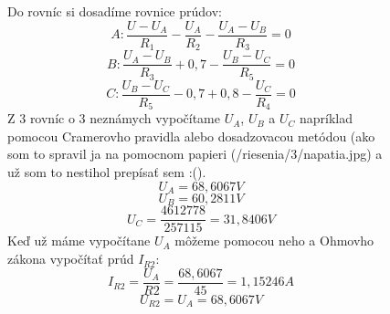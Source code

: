 \begin{figure}[!ht]
\begin{center}
    Do rovníc si dosadíme rovnice prúdov:
    \[
        A: \frac{U - U_A}{R_1} - \frac{U_A}{R_2} - \frac{U_A - U_B}{R_3} = 0
    \]
    \[
        B: \frac{U_A - U_B}{R_3} + 0,7 - \frac{U_B - U_C}{R_5} = 0
    \]
    \[
        C: \frac{U_B - U_C}{R_5} - 0,7 + 0,8 - \frac{U_C}{R_4} = 0
    \]
    Z 3 rovníc o 3 neznámych vypočítame $U_A$, $U_B$ a $U_C$ napríklad pomocou Cramerovho pravidla alebo dosadzovacou metódou (ako som to spravil ja na pomocnom papieri (/riesenia/3/napatia.jpg) a už som to nestihol prepísať sem :().
    \[
        U_A = 68,6067 V
    \]
    \[
        U_B = 60,2811 V
    \]
    \[
        U_C = \frac{4612778}{257115} = 31,8406 V
    \]
    Keď už máme vypočítane $U_A$ môžeme pomocou neho a Ohmovho zákona vypočítať prúd $I_{R2}$:
    \[
        I_{R2} = \frac{U_A}{R2} =
        \frac{68,6067}{45} = 1,15246 A
    \]
    \[
        U_{R2} = U_A = 68,6067 V
    \]
\end{center}
\end{figure}
